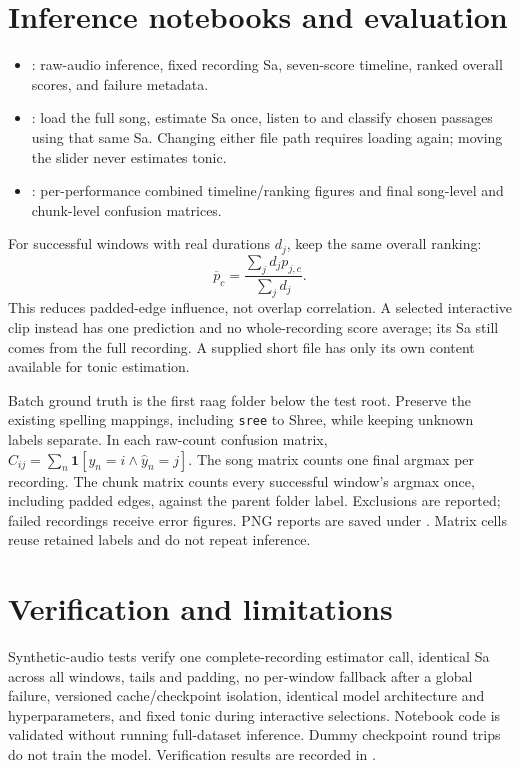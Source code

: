\documentclass[11pt,a4paper]{article}
\begin{document}
\section{Inference notebooks and evaluation}
\begin{itemize}
\item {}: raw-audio inference, fixed recording
Sa, seven-score timeline, ranked overall scores, and failure metadata.
\item {}: load the full song, estimate
Sa once, listen to and classify chosen passages using that same Sa. Changing
either file path requires loading again; moving the slider never estimates tonic.
\item {}: per-performance combined
timeline/ranking figures and final song-level and chunk-level confusion matrices.
\end{itemize}
For successful windows with real durations $d_j$, keep the same overall ranking:
\[
\overline p_c=\frac{\sum_j d_jp_{j,c}}{\sum_j d_j}.
\]
This reduces padded-edge influence, not overlap correlation. A selected interactive
clip instead has one prediction and no whole-recording score average; its Sa still
comes from the full recording. A supplied short file has only its own content
available for tonic estimation.

Batch ground truth is the first raag folder below the test root. Preserve the
existing spelling mappings, including \texttt{sree} to Shree, while keeping unknown
labels separate. In each raw-count confusion matrix,
$C_{ij}=\sum_n\mathbf 1[y_n=i\wedge\widehat y_n=j]$.
The song matrix counts one final argmax per recording. The chunk matrix counts
every successful window's argmax once, including padded edges, against the parent
folder label. Exclusions are reported; failed recordings receive error figures.
PNG reports are saved under . Matrix cells reuse
retained labels and do not repeat inference.

\section{Verification and limitations}
Synthetic-audio tests verify one complete-recording estimator call, identical Sa
across all windows, tails and padding, no per-window fallback after a global
failure, versioned cache/checkpoint isolation, identical model architecture and
hyperparameters, and fixed tonic during interactive selections. Notebook code is
validated without running full-dataset inference. Dummy checkpoint round trips do
not train the model. Verification results are recorded in
.
\end{document}

